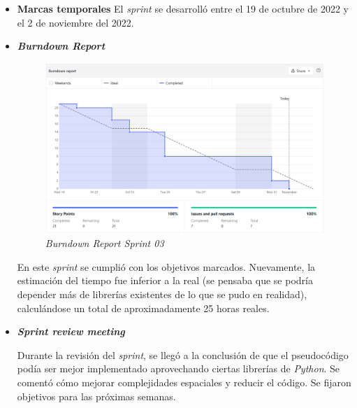 \begin{itemize}
\begin{enumerate}
	\end{enumerate}
	
	\item \textbf{Marcas temporales}	
	El \textit{sprint} se desarrolló entre el 19 de octubre de 2022 y el 2 de noviembre del 2022.
	
	\item \textbf{\textit{Burndown Report}}
	
		\begin{figure}[h]
		\caption{\textit{Burndown Report Sprint 03}}
		\centering
		\includegraphics[width=\textwidth]{../img/anexos/s03_bdr}
		\end{figure}
	
	En este \textit{sprint} se cumplió con los objetivos marcados. Nuevamente, la estimación del tiempo fue inferior a la real (se pensaba que se podría depender más de librerías existentes de lo que se pudo en realidad), calculándose un total de aproximadamente 25 horas reales.

	\item \textbf{\textit{Sprint review meeting}}
	
	Durante la revisión del \textit{sprint}, se llegó a la conclusión de que el pseudocódigo podía ser mejor implementado aprovechando ciertas librerías de \textit{Python}. Se comentó cómo mejorar complejidades espaciales y reducir el código. Se fijaron objetivos para las próximas semanas.
	
\end{itemize}


